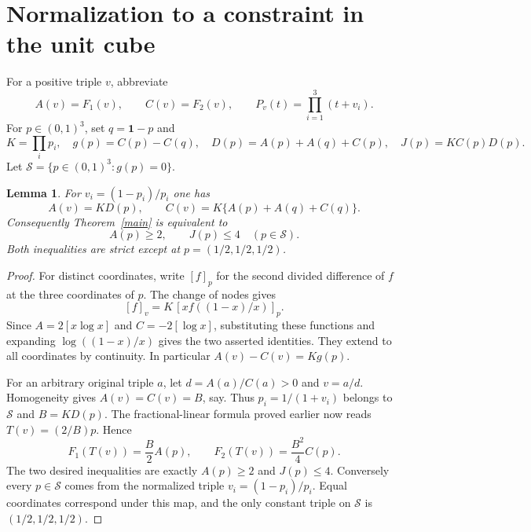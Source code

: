 \documentclass[11pt]{article}
\newtheorem{lemma}{Lemma}
\begin{document}
\section{Normalization to a constraint in the unit cube}
For a positive triple $v$, abbreviate
\[
 A(v)=F_1(v),\qquad C(v)=F_2(v),\qquad
 P_v(t)=\prod_{i=1}^3(t+v_i).
\]
For $p\in(0,1)^3$, set $q=\boldsymbol1-p$ and
\[
 K=\prod_i p_i,\quad
 g(p)=C(p)-C(q),\quad D(p)=A(p)+A(q)+C(p),\quad
 J(p)=K C(p)D(p).
\]
Let $\mathcal S=\{p\in(0,1)^3:g(p)=0\}$.

\begin{lemma}\label{cube}
For $v_i=(1-p_i)/p_i$ one has
\[
 A(v)=K D(p),\qquad
 C(v)=K\{A(p)+A(q)+C(q)\}.
\]
Consequently Theorem~\ref{main} is equivalent to
\[
 A(p)\geq2,\qquad J(p)\leq4\quad(p\in\mathcal S).
\]
Both inequalities are strict except at
$p=(1/2,1/2,1/2)$.
\end{lemma}
\begin{proof}
For distinct coordinates, write $[f]_p$ for the second divided difference
of $f$ at the three coordinates of $p$. The change of nodes gives
\[
 [f]_v=K\,[x f((1-x)/x)]_p.
\]
Since $A=2[x\log x]$ and $C=-2[\log x]$, substituting these functions
and expanding $\log((1-x)/x)$ gives the two asserted identities.
They extend to all coordinates by continuity. In particular
$A(v)-C(v)=K g(p)$.

For an arbitrary original triple $a$, let $d=A(a)/C(a)>0$ and $v=a/d$.
Homogeneity gives $A(v)=C(v)=B$, say. Thus
$p_i=1/(1+v_i)$ belongs to $\mathcal S$ and $B=K D(p)$.
The fractional-linear formula proved earlier now reads
$T(v)=(2/B)p$. Hence
\[
 F_1(T(v))=\frac B2 A(p),\qquad
 F_2(T(v))=\frac{B^2}{4}C(p).
\]
The two desired inequalities are exactly $A(p)\geq2$ and $J(p)\leq4$.
Conversely every $p\in\mathcal S$ comes from the normalized triple
$v_i=(1-p_i)/p_i$. Equal coordinates correspond under this map, and the
only constant triple on $\mathcal S$ is $(1/2,1/2,1/2)$.
\end{proof}
\end{document}
